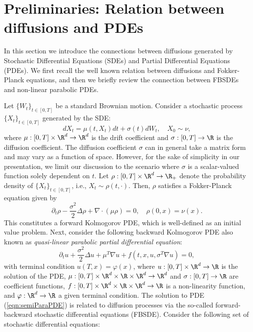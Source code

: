 \section{Preliminaries: Relation between diffusions and PDEs}
In this section we introduce the connections between diffusions generated by Stochastic Differential Equations (SDEs) and Partial Differential Equations (PDEs). We first recall the well known relation between 
diffusions and Fokker-Planck equations, and then we briefly review the connection between FBSDEs and non-linear parabolic PDEs. 

Let $\{W_t\}_{t\in[0,T]}$ be a standard Brownian motion. Consider a stochastic process $\{X_t\}_{t\in[0,T]}$ generated by the SDE:
\begin{equation*}
    dX_t = \mu(t,X_t)dt+\sigma(t)dW_t,\quad X_0\sim\nu,
\end{equation*}
where $\mu:[0,T]\times\R^d\rightarrow\R^d$ is the drift coefficient and $\sigma:[0,T]\rightarrow\R$ is the diffusion coefficient. The diffusion coefficient $\sigma$ can in general take a matrix form and may vary as a function of space. However, for the sake of simplicity in our presentation, we limit our discussion to the scenario where $\sigma$ is a scalar-valued function solely dependent on $t$. Let $\rho:[0,T]\times\R^d\rightarrow\R_+$ denote the probability density of $\{X_t\}_{t\in[0,T]}$, i.e., $X_t\sim\rho(t,\cdot)$. Then, $\rho$ satisfies a Fokker-Planck equation given by
\begin{equation*}
    \partial_t\rho-\frac{\sigma^2}{2}\Delta\rho+\nabla\cdot(\mu\rho)=0,\quad \rho(0,x) = \nu(x).
\end{equation*}
This constitutes a forward Kolmogorov PDE, which is well-defined as an initial value problem. Next, consider the following backward Kolmogorov PDE also known as \textit{quasi-linear parabolic partial differential equation}:
\begin{equation}\label{eqn:semiParaPDE}
    \partial_t u+ \frac{\sigma^2}{2}\Delta u + \mu^T\nabla u + f(t,x,u,\sigma^T\nabla u) = 0,%
\end{equation}
with terminal condition $u(T,x) = \varphi(x)$, where $u:[0,T]\times \R^d\rightarrow\R$ is the solution of the PDE, $\mu:[0,T]\times\R^d\times\R\times\R^d\rightarrow\R^d$ and $\sigma:[0,T]\rightarrow\R$ are coefficient functions, $f:[0,T]\times\R^d\times\R\times\R^d\rightarrow\R$ is a non-linearity function, and $\varphi:\R^d\rightarrow\R$ a given terminal condition. The solution to PDE (\ref{eqn:semiParaPDE}) is related to diffusion processes via the so-called forward-backward stochastic differential equations (FBSDE). Consider the following set of stochastic differential equations:
